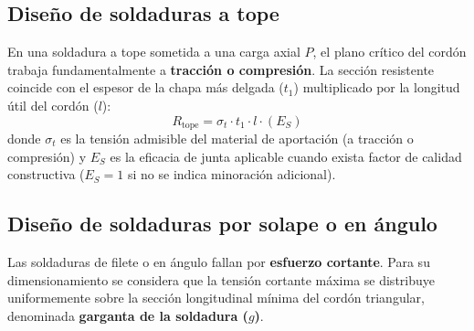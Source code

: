 \begin{table}[H]
    \centering
    \caption{Esfuerzos permisibles normalizados para electrodos de soldeo en acero estructural.}
    \label{tab:t8_electrodos}
\end{table}

\subsection{Diseño de soldaduras a tope}
En una soldadura a tope sometida a una carga axial $P$, el plano crítico del cordón trabaja fundamentalmente a \textbf{tracción o compresión}. La sección resistente coincide con el espesor de la chapa más delgada ($t_1$) multiplicado por la longitud útil del cordón ($l$):
\begin{equation}
    R_{\text{tope}} = \sigma_t \cdot t_1 \cdot l \cdot (E_S)
    \label{eq:t8_soldadura_tope}
\end{equation}
donde $\sigma_t$ es la tensión admisible del material de aportación (a tracción o compresión) y $E_S$ es la eficacia de junta aplicable cuando exista factor de calidad constructiva ($E_S = 1$ si no se indica minoración adicional).

\subsection{Diseño de soldaduras por solape o en ángulo}
Las soldaduras de filete o en ángulo fallan por \textbf{esfuerzo cortante}. Para su dimensionamiento se considera que la tensión cortante máxima se distribuye uniformemente sobre la sección longitudinal mínima del cordón triangular, denominada \textbf{garganta de la soldadura ($g$)}.

